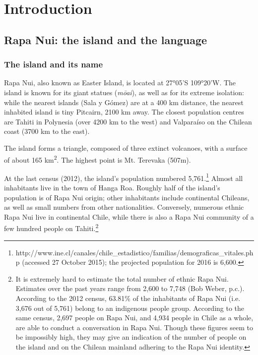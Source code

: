 \chapter[Introduction]{Introduction}\label{ch:1}
\section{Rapa Nui: the island and the language}\label{sec:1.1}
\subsection{The island and its name}\label{sec:1.1.1}

\nocite{Shopen2007-1}\nocite{Shopen2007-2}\nocite{Shopen2007-3}\nocite{Shopen1985-1}\nocite{Shopen1985-3}\nocite{Buse1963Verbal}\nocite{Buse1963Nominal}Rapa Nui, also known as Easter Island, is located at 27°05’S 109°20’W. The island is known for its giant statues (\textit{mōai}), as well as for its extreme isolation: while the nearest islands (Sala y Gómez) are at a 400 km distance, the nearest inhabited island is tiny Pitcairn, 2100 km away. The closest population centres are Tahiti in  Polynesia (over 4200 km to the west) and Valparaíso on the Chilean coast (3700 km to the east).

The island forms a triangle, composed of three extinct volcanoes, with a surface of about 165 km\textsuperscript{2}. The highest point is Mt. Terevaka (507m).

At the last census (2012), the island’s population numbered 5,761.\footnote{\label{fn:1}http://www.ine.cl/canales/chile\_estadistico/familias/demograficas\_vitales.php (accessed 27 October 2015); the projected population for 2016 is 6,600.} Almost all inhabitants live in the town of Hanga Roa. Roughly half of the island’s population is of Rapa Nui origin; other inhabitants include continental Chileans, as well as small numbers from other nationalities. Conversely, numerous ethnic Rapa Nui live in continental Chile, while there is also a Rapa Nui community of a few hundred people on Tahiti.\footnote{\label{fn:2}It is extremely hard to estimate the total number of ethnic Rapa Nui. Estimates over the past years range from 2,600 to 7,748 (Bob Weber, p.c.). According to the 2012 census, 63.81\% of the inhabitants of Rapa Nui (i.e. 3,676 out of 5,761) belong to an indigenous people group. According to the same census, 2,697 people on Rapa Nui, and 4,934 people in Chile as a whole, are able to conduct a conversation in Rapa Nui. Though these figures seem to be impossibly high, they may give an indication of the number of people on the island and on the Chilean mainland adhering to the Rapa Nui identity.} 

